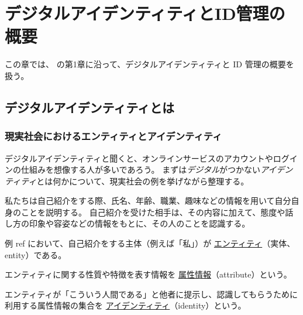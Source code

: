 \documentclass[uplatex]{jsarticle}
\def\ref#1{ref}%
\def\label#1{}%
\begin{document}
\section{デジタルアイデンティティとID管理の概要}

この章では、\cite{Ito2026} の第1章に沿って、デジタルアイデンティティと ID 管理の概要を扱う。

\subsection{デジタルアイデンティティとは}

\subsubsection{現実社会におけるエンティティとアイデンティティ}

デジタルアイデンティティと聞くと、オンラインサービスのアカウントやログインの仕組みを想像する人が多いであろう。
まずは\emph{デジタル}がつかない\emph{アイデンティティ}とは何かについて、現実社会の例を挙げながら整理する。

\begin{exa}[自己紹介]\label{exa:ch1-self-introduction}
私たちは自己紹介をする際、氏名、年齢、職業、趣味などの情報を用いて自分自身のことを説明する。
自己紹介を受けた相手は、その内容に加えて、態度や話し方の印象や容姿などの情報をもとに、その人のことを認識する。
\end{exa}

\begin{dfn}[エンティティ]\label{dfn:entity}
例 \ref{exa:ch1-self-introduction} において、自己紹介をする主体（例えば「私」）が \underline{エンティティ}（実体、entity）である。
\end{dfn}

\begin{dfn}[属性情報]\label{dfn:attribute}
エンティティに関する性質や特徴を表す情報を \underline{属性情報}（attribute）という。
\end{dfn}

\begin{dfn}[アイデンティティ]\label{dfn:identity}
エンティティが「こういう人間である」と他者に提示し、認識してもらうために利用する属性情報の集合を \underline{アイデンティティ}（identity）という。
\end{dfn}
\end{document}
